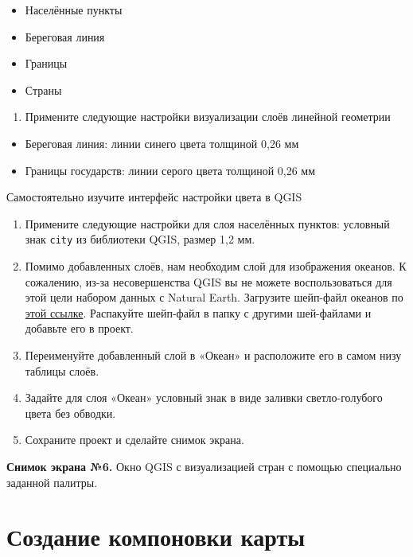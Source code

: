 \documentclass[
  12pt,
]{book}
\providecommand{\tightlist}{%
  \setlength{\itemsep}{0pt}\setlength{\parskip}{0pt}}
\begin{document}
\begin{itemize}
\tightlist
\item
  Населённые пункты
\item
  Береговая линия
\item
  Границы
\item
  Страны
\end{itemize}

\begin{enumerate}
\def\labelenumi{\arabic{enumi}.}
\setcounter{enumi}{4}
\tightlist
\item
  Примените следующие настройки визуализации слоёв линейной геометрии
\end{enumerate}

\begin{itemize}
\tightlist
\item
  Береговая линия: линии синего цвета толщиной 0,26 мм
\item
  Границы государств: линии серого цвета толщиной 0,26 мм
\end{itemize}

Самостоятельно изучите интерфейс настройки цвета в QGIS

\begin{enumerate}
\def\labelenumi{\arabic{enumi}.}
\setcounter{enumi}{5}
\item
  Примените следующие настройки для слоя населённых пунктов: условный знак \texttt{city} из библиотеки QGIS, размер 1,2 мм.
\item
  Помимо добавленных слоёв, нам необходим слой для изображения океанов. К сожалению, из-за несовершенства QGIS вы не можете воспользоваться для этой цели набором данных с Natural Earth. Загрузите шейп-файл океанов по \href{https://1drv.ms/u/s!AmtmZDq3JgxHgZswh2sFnErE-JEmGw?e=xoZW4c}{этой ссылке}. Распакуйте шейп-файл в папку с другими шей-файлами и добавьте его в проект.
\item
  Переименуйте добавленный слой в «Океан» и расположите его в самом низу таблицы слоёв.
\item
  Задайте для слоя «Океан» условный знак в виде заливки светло-голубого цвета без обводки.
\item
  Сохраните проект и сделайте снимок экрана.
\end{enumerate}

\textbf{Снимок экрана №6.} Окно QGIS с визуализацией стран с помощью специально заданной палитры.

\hypertarget{map-design-world-layout}{%
\section{Создание компоновки карты}\label{map-design-world-layout}}
\end{document}
